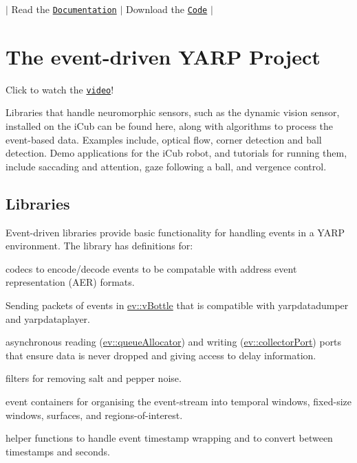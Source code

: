 $\vert$ Read the \href{http://robotology.github.io/event-driven/doxygen/doc/html/index.html}{\tt Documentation} $\vert$ Download the \href{https://github.com/robotology/event-driven}{\tt Code} $\vert$

\section*{The event-\/driven Y\+A\+RP Project}

\href{https://youtu.be/xS-7xYRYSLc}{\tt }  Click to watch the \href{https://youtu.be/xS-7xYRYSLc}{\tt video}!

Libraries that handle neuromorphic sensors, such as the dynamic vision sensor, installed on the i\+Cub can be found here, along with algorithms to process the event-\/based data. Examples include, optical flow, corner detection and ball detection. Demo applications for the i\+Cub robot, and tutorials for running them, include saccading and attention, gaze following a ball, and vergence control.

\subsection*{Libraries}

Event-\/driven libraries provide basic functionality for handling events in a Y\+A\+RP environment. The library has definitions for\+:
\begin{DoxyItemize}
\item codecs to encode/decode events to be compatable with address event representation (A\+ER) formats.
\item Sending packets of events in {\ttfamily \hyperlink{classev_1_1vBottle}{ev\+::v\+Bottle}} that is compatible with yarpdatadumper and yarpdataplayer.
\item asynchronous reading ({\ttfamily \hyperlink{classev_1_1queueAllocator}{ev\+::queue\+Allocator}}) and writing ({\ttfamily \hyperlink{classev_1_1collectorPort}{ev\+::collector\+Port}}) ports that ensure data is never dropped and giving access to delay information.
\item filters for removing salt and pepper noise.
\item event containers for organising the event-\/stream into temporal windows, fixed-\/size windows, surfaces, and regions-\/of-\/interest.
\item helper functions to handle event timestamp wrapping and to convert between timestamps and seconds.
\end{DoxyItemize}

